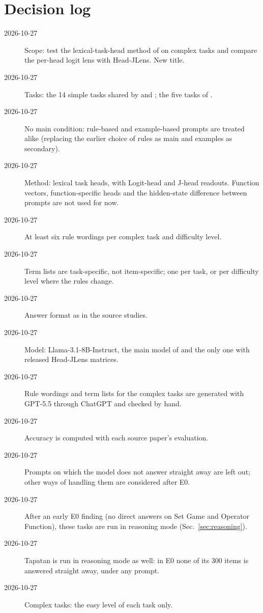 \documentclass[11pt,a4paper]{article}
\begin{document}
\section*{Decision log}\label{app:decisions}
\begin{description}
\item[2026-10-27] Scope: test the lexical-task-head method of \citet{yang2026shared} on complex tasks and compare the per-head logit lens with Head-JLens. New title.
\item[2026-10-27] Tasks: the 14 simple tasks shared by \citet{yang2026shared} and \citet{davidson2025different}; the five tasks of \citet{fu2026rules}.
\item[2026-10-27] No main condition: rule-based and example-based prompts are treated alike (replacing the earlier choice of rules as main and examples as secondary).
\item[2026-10-27] Method: lexical task heads, with Logit-head and J-head readouts. Function vectors, function-specific heads and the hidden-state difference between prompts are not used for now.
\item[2026-10-27] At least six rule wordings per complex task and difficulty level.
\item[2026-10-27] Term lists are task-specific, not item-specific; one per task, or per difficulty level where the rules change.
\item[2026-10-27] Answer format as in the source studies.
\item[2026-10-27] Model: Llama-3.1-8B-Instruct, the main model of \citet{yang2026shared} and the only one with released Head-JLens matrices.
\item[2026-10-27] Rule wordings and term lists for the complex tasks are generated with GPT-5.5 through ChatGPT and checked by hand.
\item[2026-10-27] Accuracy is computed with each source paper's evaluation.
\item[2026-10-27] Prompts on which the model does not answer straight away are left out; other ways of handling them are considered after E0.
\item[2026-10-27] After an early E0 finding (no direct answers on Set Game and Operator Function), these tasks are run in reasoning mode (Sec.~\ref{sec:reasoning}).
\item[2026-10-27] Tapatan is run in reasoning mode as well: in E0 none of its 300 items is answered straight away, under any prompt.
\item[2026-10-27] Complex tasks: the easy level of each task only.

\end{description}
\end{document}
